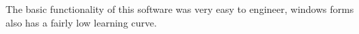 \documentclass[../Main.tex]{subfiles}
\begin{document}
The basic functionality of this software was very easy to engineer, windows forms also has a fairly low learning curve. 
\end{document}
